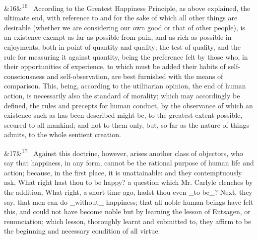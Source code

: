 \documentclass[12pt]{article}
\newcommand{\para}[1][]{\par\noindent\ifx&#1&\else\textsuperscript{\footnotesize #1}~\fi}
\begin{document}
\para[16] According to the Greatest Happiness Principle, as above explained, the ultimate end, with reference to and for the sake of which all other things are desirable (whether we are considering our own good or that of other people), is an existence exempt as far as possible from pain, and as rich as possible in enjoyments, both in point of quantity and quality; the test of quality, and the rule for measuring it against quantity, being the preference felt by those who, in their opportunities of experience, to which must be added their habits of self-consciousness and self-observation, are best furnished with the means of comparison. This, being, according to the utilitarian opinion, the end of human action, is necessarily also the standard of morality; which may accordingly be defined, the rules and precepts for human conduct, by the observance of which an existence such as has been described might be, to the greatest extent possible, secured to all mankind; and not to them only, but, so far as the nature of things admits, to the whole sentient creation.

\para[17] Against this doctrine, however, arises another class of objectors, who say that happiness, in any form, cannot be the rational purpose of human life and action; because, in the first place, it is unattainable: and they contemptuously ask, What right hast thou to be happy? a question which Mr. Carlyle clenches by the addition, What right, a short time ago, hadst thou even \_to be\_? Next, they say, that men can do \_without\_ happiness; that all noble human beings have felt this, and could not have become noble but by learning the lesson of Entsagen, or renunciation; which lesson, thoroughly learnt and submitted to, they affirm to be the beginning and necessary condition of all virtue.
\end{document}
